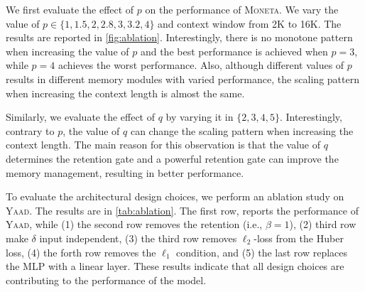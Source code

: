 \documentclass{article}
\newcommand{\ymodel}[0]{\textsc{Yaad}}
\newcommand{\mmodel}[0]{\textsc{Moneta}}
\theoremstyle{plain}
\theoremstyle{definition}
\theoremstyle{remark}
\newcommand{\head}[1]{\vspace{1.7mm}\noindent{{\textcolor{c2}{\bf #1.}}}}
\begin{document}
\head{The Effect of $p$ on Performance}
We first evaluate the effect of $p$ on the performance of \mmodel. We vary the value of $p \in \{1, 1.5, 2, 2.8, 3, 3.2, 4\}$ and context window from 2K to 16K. The results are reported in \autoref{fig:ablation}. Interestingly, there is no monotone pattern when increasing the value of $p$ and the best performance is achieved when $p=3$, while $p = 4$ achieves the worst performance. Also, although different values of $p$ results in different memory modules with varied performance, the scaling pattern when increasing the context length is almost the same. 


\head{The Effect of $q$ on Performance}
Similarly, we evaluate the effect of $q$ by varying it in $\{2, 3, 4, 5\}$. Interestingly, contrary to $p$, the value of $q$ can change the scaling pattern when increasing the context length. The main reason for this observation is that the value of $q$ determines the retention gate and a powerful retention gate can improve the memory management, resulting in better performance. 



\head{The Effect of Design}
To evaluate the architectural design choices, we perform an ablation study on \ymodel. The results are in \autoref{tab:ablation}. The first row, reports the performance of \ymodel, while (1) the second row removes the retention (i.e., $\beta = 1$), (2) third row make $\delta$ input independent, (3) the third row removes $\ell_2$-loss from the Huber loss, (4) the forth row removes the $\ell_1$ condition, and (5) the last row replaces the MLP with a linear layer. These results indicate that all design choices are contributing to the performance of the model.

\vspace{4ex}
\end{document}
